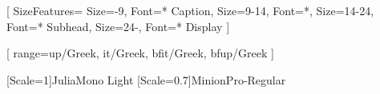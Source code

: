 \usepackage{titlesec}
\usepackage{fontspec}
\usepackage{unicode-math}
\usepackage{fancyhdr}
\usepackage{newunicodechar}
\usepackage{bbding}             %

\newunicodechar{ }{\thinspace}

\setmainfont{Brioso Pro}[
  SizeFeatures={
    {Size={-9}, Font=* Caption},
    {Size={9-14}, Font=*},
    {Size={14-24}, Font=* Subhead},
    {Size={24-}, Font=* Display}
  }
]


[
  range={up/Greek, it/Greek, bfit/Greek, bfup/Greek}
]

\setmonofont[Scale=MatchLowercase]{Fira Mono:style=Regular}

\newfontfamily{\peacesymbolfont}[Scale=1]{JuliaMono Light}
\newfontfamily{\floralbulletfont}[Scale=0.7]{MinionPro-Regular}

\pagestyle{fancy}
\fancyhf{}                      %
\rhead{\thepage}
\renewcommand{\headrulewidth}{0pt}
\renewcommand{\arraystretch}{1.5}

\newcommand{\plus}{\mathbin{+}}
\newcommand{\minus}{\mathbin{-}}

\titleformat{\chapter}{\normalfont\fontsize{24}{30}\selectfont}{\thechapter}{1em}{}
\titleformat{\section}{\normalfont\fontsize{18}{22}\selectfont}{\thesection}{1em}{}
\titleformat{\subsection}{\normalfont\fontsize{16}{20}\selectfont}{\thesubsection}{1em}{}
\titleformat{\subsubsection}{\normalfont\fontsize{14}{18}\selectfont}{\thesubsubsection}{1em}{}

